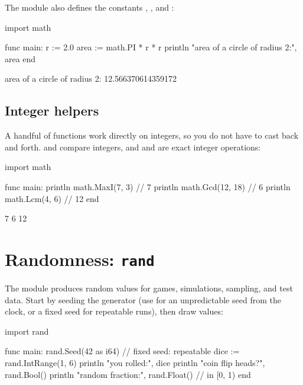 The module also defines the constants , , and
:

\begin{salamen}
import math

func main:
    r := 2.0
    area := math.PI * r * r
    println "area of a circle of radius 2:", area
end
\end{salamen}

\begin{progout}
area of a circle of radius 2: 12.566370614359172
\end{progout}

\subsection{Integer helpers}

A handful of functions work directly on integers, so you do not have to cast back
and forth.  and  compare integers, and
 and  are exact integer operations:

\begin{salamen}
import math

func main:
    println math.MaxI(7, 3)    // 7
    println math.Gcd(12, 18)   // 6
    println math.Lcm(4, 6)     // 12
end
\end{salamen}

\begin{progout}
7
6
12
\end{progout}

\section{Randomness: \texttt{rand}}

The  module produces random values for games, simulations, sampling,
and test data. Start by seeding the generator (use  for an
unpredictable seed from the clock, or a fixed seed for repeatable runs), then draw
values:

\begin{salamen}
import rand

func main:
    rand.Seed(42 as i64)                       // fixed seed: repeatable
    dice := rand.IntRange(1, 6)
    println "you rolled:", dice
    println "coin flip heads?", rand.Bool()
    println "random fraction:", rand.Float()   // in [0, 1)
end
\end{salamen}

